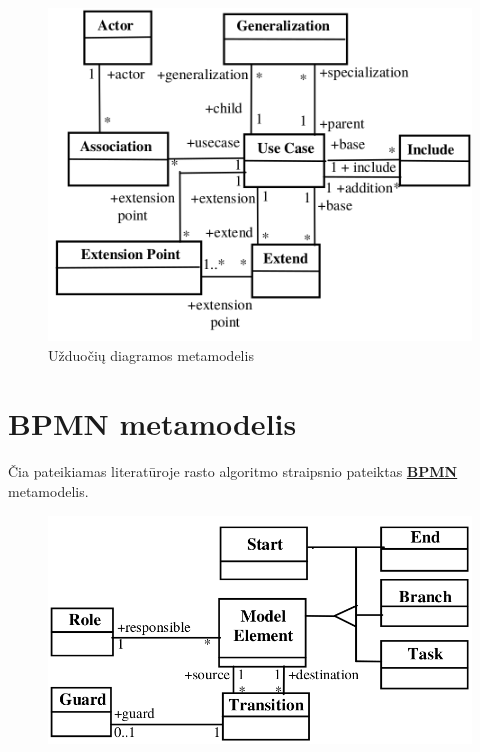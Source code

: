 \documentclass{VUMIFInfBakalaurinis}
\newcommand{\bhyperref}[2]{\hyperref[#1]{\textbf{#2}}}
\newcommand{\BPMN}{\bhyperref{section:bpmn}{BPMN}}
\begin{document}
\begin{figure}[H]
    \centering
    \includegraphics[width=\textwidth]{img/appendix/literature_algorythm/use_cases_metamodel}
    \caption{Užduočių diagramos metamodelis}
\end{figure}

\section{BPMN metamodelis} \label{appendix:lit_alg_metamodels_bpmn}

Čia pateikiamas literatūroje rasto algoritmo straipsnio \cite{algUseCasesFromBpmn} pateiktas \BPMN{} metamodelis.

\begin{figure}[H]
    \centering
    \includegraphics[width=\textwidth]{img/appendix/literature_algorythm/bpmn_metamodel}
\end{figure}
\end{document}
